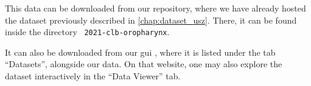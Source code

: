 \begin{tcolorbox}[
    title=\faIcon{database} Data,
    parbox=false,
    float
]
    This data can be downloaded from our  repository, where we have already hosted the dataset previously described in \cref{chap:dataset_usz}. There, it can be found inside the directory ~\texttt{2021-clb-oropharynx}.

    It can also be downloaded from our \gls{gui} \inlinelyproxlogo{}, where it is listed under the tab ``Datasets'', alongside our data. On that website, one may also explore the dataset interactively in the ``Data Viewer'' tab.
\end{tcolorbox}
